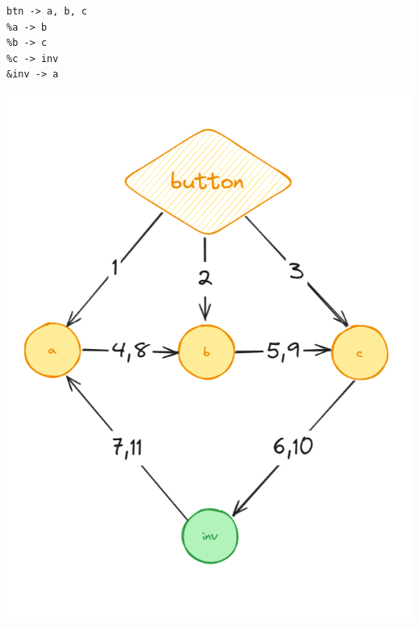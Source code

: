 \begin{frame}[fragile]
    \begin{center}
        \begin{minipage}{0.45\textwidth}
            \begin{center}
                \begin{verbatim}
btn -> a, b, c
%a -> b
%b -> c
%c -> inv
&inv -> a        
                \end{verbatim}
            \end{center}
        \end{minipage}
        \begin{minipage}{0.45\textwidth}
            \begin{center}
                \includegraphics[width=\textwidth]{Day20ExampleGraph}
            \end{center}
        \end{minipage}
    \end{center}

\end{frame}

